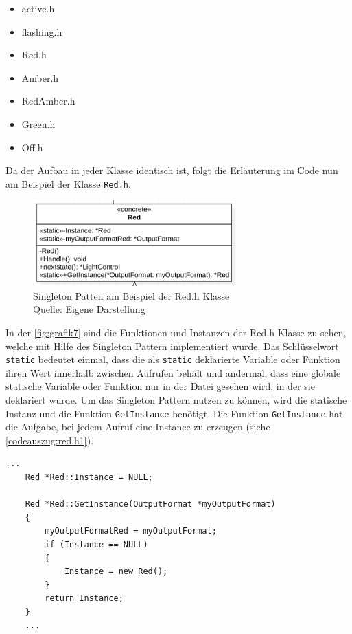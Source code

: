 \begin{itemize}
	\item active.h
	\item flashing.h
	\item Red.h
	\item Amber.h
	\item RedAmber.h
	\item Green.h
	\item Off.h
\end{itemize}

Da der Aufbau in jeder Klasse identisch ist, folgt die Erläuterung im Code nun am Beispiel der Klasse \texttt{Red.h}.\\

\begin{figure}[H] 
	\centering
	\includegraphics[width=0.7\textwidth]{images/07.png}
	\caption{Singleton Patten am Beispiel der Red.h Klasse \protect \\ Quelle: Eigene Darstellung }
	\label{fig:grafik7}
\end{figure}

In der \autoref{fig:grafik7} sind die Funktionen und Instanzen der Red.h Klasse zu sehen, welche mit Hilfe des Singleton Pattern implementiert wurde. Das Schlüsselwort \texttt{static} bedeutet einmal, dass die als \texttt{static} deklarierte Variable oder Funktion ihren Wert innerhalb zwischen Aufrufen behält und andermal, dass eine globale statische Variable oder Funktion nur in der Datei \glqq gesehen\grqq{} wird, in der sie deklariert wurde. Um das Singleton Pattern nutzen zu können, wird die statische Instanz und die Funktion \texttt{GetInstance} benötigt. Die Funktion \texttt{GetInstance} hat die Aufgabe, bei jedem Aufruf eine Instance zu erzeugen (siehe \autoref{codeauszug:red.h1}). \\

\begin{lstlisting}[style=myC,caption={Red.cpp - Singleton in der Klasse Red},label={codeauszug:red.h1},captionpos=b]
	...
	Red *Red::Instance = NULL;
	
	Red *Red::GetInstance(OutputFormat *myOutputFormat)
	{
		myOutputFormatRed = myOutputFormat; 
		if (Instance == NULL)
		{
			Instance = new Red();
		}
		return Instance;
	}
	...
\end{lstlisting}

